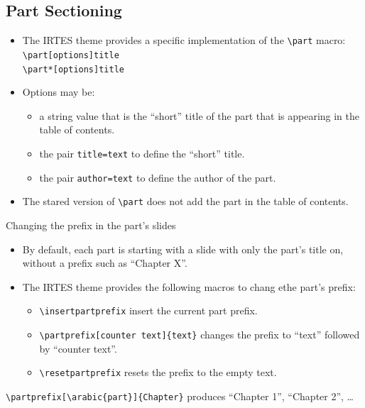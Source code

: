 \documentclass[english,circlenumberstyle]{irtesbeamer}
\begin{document}
\subsection{Part Sectioning}
\begin{frame}{\subsecname}
	\begin{itemize}
	\item The IRTES theme provides a specific implementation of the \texttt{{\textbackslash}part} macro: \\
		\texttt{{\textbackslash}part[options]{title}} \\
		\texttt{{\textbackslash}part*[options]{title}} \\
	\item Options may be: \begin{itemize}
		\item a string value that is the ``short'' title of the part that is appearing in the table of contents.
		\item the pair \texttt{title=text} to define the ``short'' title.
		\item the pair \texttt{author=text} to define the author of the part.
		\end{itemize}
	\item The stared version of \texttt{{\textbackslash}part} does not add the part in the table of contents.
	\end{itemize}
\end{frame}

\begin{frame}{Changing the prefix in the part's slides}
	\begin{itemize}
	\item By default, each part is starting with a slide with only the part's title on, without a prefix such as ``Chapter X''.
	\item The IRTES theme provides the following macros to chang ethe part's prefix:
		\begin{itemize}
		\item \texttt{{\textbackslash}insertpartprefix} insert the current part prefix.
		\item \texttt{{\textbackslash}partprefix[counter text]\{text\}} changes the prefix to ``text'' followed by ``counter text''.
		\item \texttt{{\textbackslash}resetpartprefix} resets the prefix to the empty text.
		\end{itemize}
	\end{itemize}
	\begin{example}
		\texttt{{\textbackslash}partprefix[{\textbackslash}arabic\{part\}]\{Chapter\}} produces ``Chapter 1'', ``Chapter 2'', \dots
	\end{example}
\end{frame}
\end{document}
